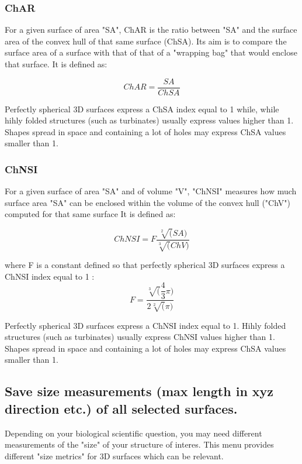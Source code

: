 \subsubsection{ChAR}

\noindent For a given surface of area "SA", ChAR is the ratio between "SA" and the surface area of the convex hull of that same surface (ChSA). Its aim is to compare the surface area of a surface with that of that of a "wrapping bag" that would enclose that surface. It is defined as: 


\begin{equation}
ChAR = \dfrac{SA}{ChSA}
\end{equation}

\noindent Perfectly spherical 3D surfaces express a ChSA index equal to 1 while, while hihly folded structures (such as turbinates)  usually express values higher than 1. Shapes spread in space and containing a lot of holes may express ChSA values smaller than 1.

\subsubsection{ChNSI}
\noindent For a given surface of area "SA" and of volume "V", "ChNSI" measures how much surface area "SA" can be enclosed within the volume of the convex hull ("ChV") computed for that same surface It is defined as: 

\begin{equation}
ChNSI = F \dfrac{\sqrt[2](SA)}{\sqrt[3](ChV)}
\end{equation}

\noindent where F is a constant defined so that perfectly spherical 3D surfaces express a ChNSI index equal to 1 :
\begin{equation}
F = \dfrac{\sqrt[3](\dfrac{4}{3}\pi)}{2\sqrt[2](\pi)}
\end{equation}

\noindent Perfectly spherical 3D surfaces express a ChNSI index equal to 1. Hihly folded structures (such as turbinates) usually express ChNSI values higher than 1. Shapes spread in space and containing a lot of holes may express ChSA values smaller than 1.

\subsection{Save size measurements (max length in xyz direction etc.) of all selected surfaces.}
Depending on your biological scientific question, you may need different measurements of the "size" of your structure of interes. This menu provides different "size metrics" for 3D surfaces which can be relevant. \\
